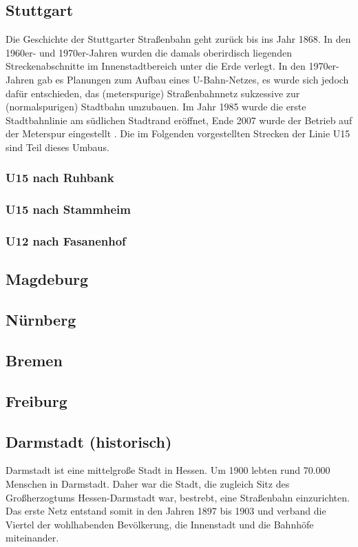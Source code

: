 \subsection{Stuttgart}

Die Geschichte der Stuttgarter Straßenbahn geht zurück bis ins Jahr 1868. In den 1960er- und 1970er-Jahren wurden die damals oberirdisch liegenden Streckenabschnitte im Innenstadtbereich unter die Erde verlegt.
In den 1970er-Jahren gab es Planungen zum Aufbau eines U-Bahn-Netzes, es wurde sich jedoch dafür entschieden, das (meterspurige) Straßenbahnnetz sukzessive zur (normalspurigen) Stadtbahn umzubauen. Im Jahr 1985 wurde die erste Stadtbahnlinie am südlichen Stadtrand eröffnet, Ende 2007 wurde der Betrieb auf der Meterspur eingestellt \cite{SSBgeschichte}. Die im Folgenden vorgestellten Strecken der Linie U15 sind Teil dieses Umbaus.

\subsubsection*{U15 nach Ruhbank}



\subsubsection*{U15 nach Stammheim}

\subsubsection*{U12 nach Fasanenhof}


\subsection{Magdeburg}


\subsection{Nürnberg}


\subsection{Bremen}


\subsection{Freiburg}


\subsection{Darmstadt (historisch)}
Darmstadt ist eine mittelgroße Stadt in Hessen. Um 1900 lebten rund 70.000 Menschen in
Darmstadt. Daher war die Stadt, die zugleich Sitz des Großherzogtums Hessen-Darmstadt
war, bestrebt, eine Straßenbahn einzurichten. Das erste Netz entstand somit in den
Jahren 1897 bis 1903 und verband die Viertel der wohlhabenden Bevölkerung, die
Innenstadt und die Bahnhöfe miteinander.

